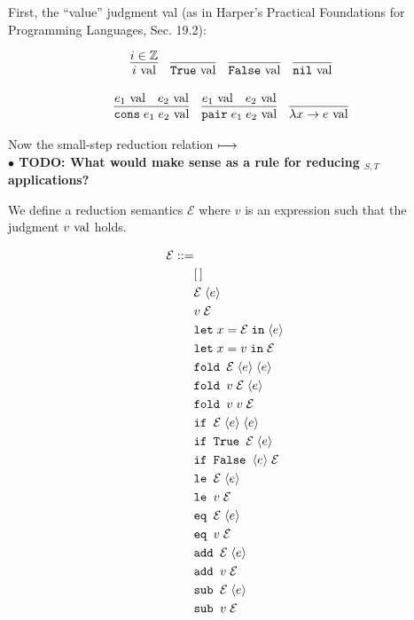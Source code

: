 \documentclass[10pt]{article}
\begin{document}
First, the ``value'' judgment val (as in Harper's Practical Foundations for Programming Languages, Sec. 19.2):

\[
  \begin{array}{cc}
    \infer{i \val}{i \in \mathbb{Z}}
    ~~~
    \infer{\True \val}{}
    ~~~
    \infer{\False \val}{}
    ~~~
    \infer{\nil \val}{}
    \\\\
    \infer{\cons\; e_1\; e_2 \val}{e_1 \val & e_2 \val}
    ~~~
    \infer{\pair\; e_1\; e_2 \val}{e_1 \val & e_2 \val}
    ~~~
    \infer{\lambda x \ra e \val}{}
  \end{array}
\]

\noindent
Now the small-step reduction relation $\longmapsto$\\

\textbf{$\bullet$ TODO: What would make sense as a rule for reducing $_{S,T}$ applications?}

We define a reduction semantics $\mathcal{E}$ where $v$ is an expression such that the judgment $v \textnormal{ val}$ holds.

{\footnotesize
\begin{align*}
  \mathcal{E} ::=\\
    &[\,]\\
    &\mathcal{E}\; \langle e \rangle\\
    &v\; \mathcal{E}\\
    &\texttt{let}\; x = \mathcal{E}\; \texttt{in}\; \langle e \rangle\\
    &\texttt{let}\; x = v\; \texttt{in}\; \mathcal{E}\\
    &\texttt{fold } \mathcal{E}\; \langle e \rangle\; \langle e \rangle\\
    &\texttt{fold } v\; \mathcal{E}\; \langle e \rangle\\
    &\texttt{fold } v\; v\; \mathcal{E}\\
    &\texttt{if } \mathcal{E}\; \langle e \rangle\; \langle e \rangle\\
    &\texttt{if True } \mathcal{E}\; \langle e \rangle\\
    &\texttt{if False } \langle e \rangle\; \mathcal{E}\\
    &\texttt{le } \mathcal{E}\; \langle e \rangle\\
    &\texttt{le } v\; \mathcal{E}\\
    &\texttt{eq } \mathcal{E}\; \langle e \rangle\\
    &\texttt{eq } v\; \mathcal{E}\\
    &\texttt{add } \mathcal{E}\; \langle e \rangle\\
    &\texttt{add } v\; \mathcal{E}\\
    &\texttt{sub } \mathcal{E}\; \langle e \rangle\\
    &\texttt{sub } v\; \mathcal{E}\\
\end{align*}
}
\end{document}
